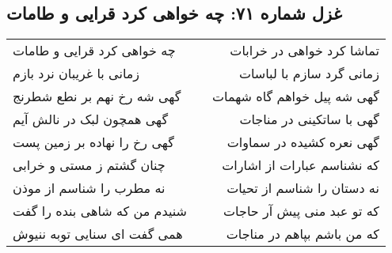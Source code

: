 \begin{center}
\section*{غزل شماره ۷۱: چه خواهی کرد قرایی و طامات}
\label{sec:071}
\begin{longtable}{l p{0.5cm} r}
چه خواهی کرد قرایی و طامات
&&
تماشا کرد خواهی در خرابات
\\
زمانی با غریبان نرد بازم
&&
زمانی گرد سازم با لباسات
\\
گهی شه رخ نهم بر نطع شطرنج
&&
گهی شه پیل خواهم گاه شهمات
\\
گهی همچون لبک در نالش آیم
&&
گهی با ساتکینی در مناجات
\\
گهی رخ را نهاده بر زمین پست
&&
گهی نعره کشیده در سماوات
\\
چنان گشتم ز مستی و خرابی
&&
که نشناسم عبارات از اشارات
\\
نه مطرب را شناسم از موذن
&&
نه دستان را شناسم از تحیات
\\
شنیدم من که شاهی بنده را گفت
&&
که تو عبد منی پیش آر حاجات
\\
همی گفت ای سنایی توبه ننیوش
&&
که من باشم بپاهم در مناجات
\\
\end{longtable}
\end{center}
